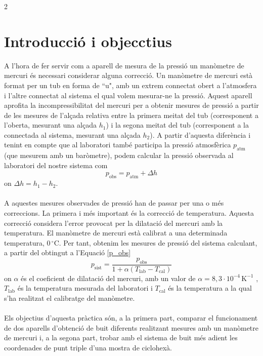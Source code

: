 \documentclass[12pt,twosides,onecolumn,openany]{article}
\begin{document}
\begin{multicols}{2}
\section{Introducció i objecctius}
A l'hora de fer servir com a aparell de mesura de la pressió un manòmetre de mercuri és necessari considerar alguna correcció. Un manòmetre de mercuri està format per un tub en forma de ``u", amb un extrem connectat obert a l'atmosfera i l'altre connectat al sistema el qual volem mesurar-ne la pressió. Aquest aparell aprofita la incompressibilitat del mercuri per a obtenir mesures de pressió a partir de les mesures de l'alçada relativa entre la primera meitat del tub (corresponent a l'oberta, mesurant una alçada $h_1$) i la segona meitat del tub (corresponent a la connectada al sistema, mesurant una alçada $h_2$). A partir d'aquesta diferència i tenint en compte que al laboratori també participa la pressió atmosfèrica $p_{\text{atm}}$ (que mesurem amb un baròmetre), podem calcular la pressió observada al laboratori del nostre sistema com 
\begin{equation}\label{p_obs}
    p_{\text{obs}} = p_{\text{atm}} + \Delta h
\end{equation}
on $\Delta h = h_1 - h_2$.\\\\
A aquestes mesures observades de pressió han de passar per una o més correccions. La primera i més important és la correcció de temperatura. Aquesta correcció considera l'error provocat per la dilatació del mercuri amb la temperatura. El manòmetre de mercuri està calibrat a una determinada temperatura, \(0 \,^\circ\text{C}\). Per tant, obtenim les mesures de pressió del sistema calculant, a partir del obtingut a l'Equació \eqref{p_obs}
\begin{equation}\label{correcció_manomètrica}
    p_{\text{sist}} = \frac{p_{\text{obs}}}{1+\alpha(T_{\text{lab}} - T_{\text{cal}})}
\end{equation}
on $\alpha$ és el coeficient de dilatació del mercuri, amb un valor de \( \alpha = 8,3\cdot 10^{-4} \, \text{K}^{-1}\) \cite{guia_lab}, $T_{\text{lab}}$ és la temperatura mesurada del laboratori i $T_{\text{cal}}$ és la temperatura a la qual s'ha realitzat el calibratge del manòmetre.\\\\
Els objectius d'aquesta pràctica són, a la primera part, comparar el funcionament de dos aparells d'obtenció de buit diferents realitzant mesures amb un manòmetre de mercuri i, a la segona part, trobar amb el sistema de buit més adient les coordenades de punt triple d'una mostra de ciclohexà.\\\\

\end{multicols}
\end{document}
